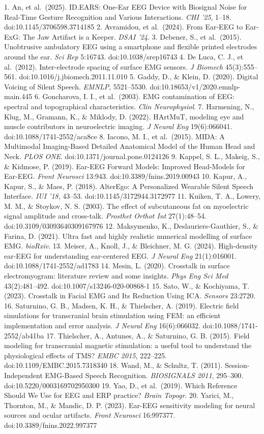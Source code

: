 \documentclass[manuscript,review,anonymous]{acmart}
\begin{document}
1. An, et al.~(2025). ID.EARS: One-Ear EEG Device with Biosignal Noise for Real-Time Gesture Recognition and Various Interactions. \emph{CHI '25}, 1--18. doi:10.1145/3706598.3714185
2. Avramidou, et al.~(2024). From Ear-EEG to Ear-ExG: The Jaw Artifact is a Keeper. \emph{DSAI '24}.
3. Debener, S., et al.~(2015). Unobtrusive ambulatory EEG using a smartphone and flexible printed electrodes around the ear. \emph{Sci Rep} 5:16743. doi:10.1038/srep16743
4. De Luca, C. J., et al.~(2012). Inter-electrode spacing of surface EMG sensors. \emph{J Biomech} 45(3):555--561. doi:10.1016/j.jbiomech.2011.11.010
5. Gaddy, D., \& Klein, D. (2020). Digital Voicing of Silent Speech. \emph{EMNLP}, 5521--5530. doi:10.18653/v1/2020.emnlp-main.445
6. Goncharova, I. I., et al.~(2003). EMG contamination of EEG: spectral and topographical characteristics. \emph{Clin Neurophysiol}.
7. Harmening, N., Klug, M., Gramann, K., \& Miklody, D. (2022). HArtMuT, modeling eye and muscle contributors in neuroelectric imaging. \emph{J Neural Eng} 19(6):066041. doi:10.1088/1741-2552/aca8ce
8. Iacono, M. I., et al.~(2015). MIDA: A Multimodal Imaging-Based Detailed Anatomical Model of the Human Head and Neck. \emph{PLOS ONE}. doi:10.1371/journal.pone.0124126
9. Kappel, S. L., Makeig, S., \& Kidmose, P. (2019). Ear-EEG Forward Models: Improved Head-Models for Ear-EEG. \emph{Front Neurosci} 13:943. doi:10.3389/fnins.2019.00943
10. Kapur, A., Kapur, S., \& Maes, P. (2018). AlterEgo: A Personalized Wearable Silent Speech Interface. \emph{IUI '18}, 43--53. doi:10.1145/3172944.3172977
11. Kuiken, T. A., Lowery, M. M., \& Stoykov, N. S. (2003). The effect of subcutaneous fat on myoelectric signal amplitude and cross-talk. \emph{Prosthet Orthot Int} 27(1):48--54. doi:10.3109/03093640309167976
12. Maksymenko, K., Deslauriers-Gauthier, S., \& Farina, D. (2021). Ultra fast and highly realistic numerical modelling of surface EMG. \emph{bioRxiv}.
13. Meiser, A., Knoll, J., \& Bleichner, M. G. (2024). High-density ear-EEG for understanding ear-centered EEG. \emph{J Neural Eng} 21(1):016001. doi:10.1088/1741-2552/ad1783
14. Mesin, L. (2020). Crosstalk in surface electromyogram: literature review and some insights. \emph{Phys Eng Sci Med} 43(2):481--492. doi:10.1007/s13246-020-00868-1
15. Sato, W., \& Kochiyama, T. (2023). Crosstalk in Facial EMG and Its Reduction Using ICA. \emph{Sensors} 23:2720.
16. Saturnino, G. B., Madsen, K. H., \& Thielscher, A. (2019). Electric field simulations for transcranial brain stimulation using FEM: an efficient implementation and error analysis. \emph{J Neural Eng} 16(6):066032. doi:10.1088/1741-2552/ab41ba
17. Thielscher, A., Antunes, A., \& Saturnino, G. B. (2015). Field modeling for transcranial magnetic stimulation: a useful tool to understand the physiological effects of TMS? \emph{EMBC 2015}, 222--225. doi:10.1109/EMBC.2015.7318340
18. Wand, M., \& Schultz, T. (2011). Session-Independent EMG-Based Speech Recognition. \emph{BIOSIGNALS 2011}, 295--300. doi:10.5220/0003169702950300
19. Yao, D., et al.~(2019). Which Reference Should We Use for EEG and ERP practice? \emph{Brain Topogr}.
20. Yarici, M., Thornton, M., \& Mandic, D. P. (2023). Ear-EEG sensitivity modeling for neural sources and ocular artifacts. \emph{Front Neurosci} 16:997377. doi:10.3389/fnins.2022.997377
\end{document}
